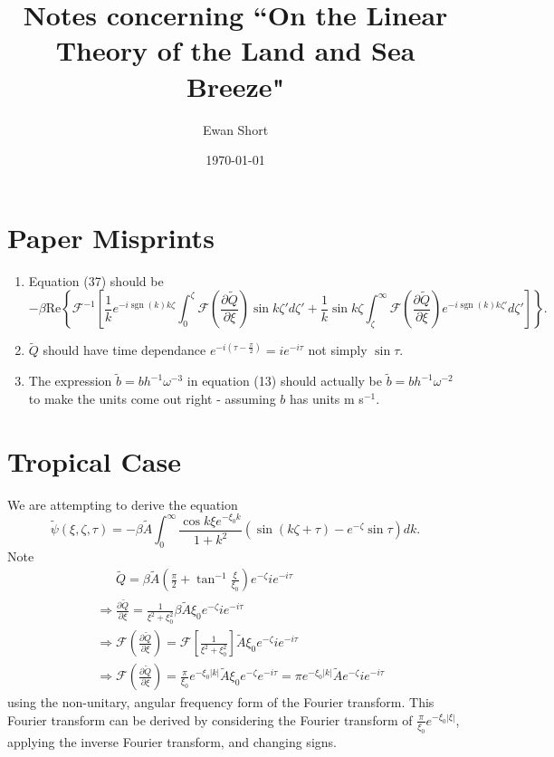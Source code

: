 \documentclass[12pt]{article}
\title{Notes concerning ``On the Linear Theory of the Land and Sea Breeze"  \citep{rotunno83}}
\author{Ewan Short}
\date{\today}
\DeclareMathOperator{\sgn}{sgn}
\begin{document}
\maketitle

\section{Paper Misprints}
\begin{enumerate}
\item
Equation (37) should be 
\begin{equation*}
 -\beta \textrm{Re}\left\{ \mathcal{F}^{-1}\left[ \frac{1}{k}e^{-i\sgn(k) k \zeta} \int_0^\zeta \mathcal{F}\left(\frac{\partial \tilde{Q}}{\partial \xi}\right) \sin k\zeta' d\zeta' + \frac{1}{k}\sin k \zeta \int_\zeta^\infty \mathcal{F}\left(\frac{\partial \tilde{Q}}{\partial \xi}\right) e^{-i\sgn(k)k\zeta'} d\zeta' \right] \right\}.
\end{equation*}
\item
$\tilde{Q}$ should have time dependance $e^{-i\left(\tau-\frac{\pi}{2}\right)}=ie^{-i\tau}$ not simply $\sin\tau$. 
\item
The expression $\tilde{b} = b h^{-1} \omega^{-3}$ in equation (13) should actually be $\tilde{b} = b h^{-1} \omega^{-2}$ to make the units come out right - assuming $b$ has units m s$^{-1}$. 
\end{enumerate}

\section{Tropical Case}
We are attempting to derive the equation
\begin{equation}
\tilde{\psi} (\xi,\zeta,\tau) = -\beta \tilde{A} \int_0^\infty \frac{\cos k\xi e^{-\xi_0 k }}{1+k^2} \left(\sin(k\zeta + \tau) - e^{-\zeta}\sin\tau \right) dk. \label{Eq:target}
\end{equation}
Note
\begin{align}
&\phantom{\Rightarrow} \tilde{Q} = \beta \tilde{A} \left(\frac{\pi}{2} +\tan^{-1} \frac{\xi}{\xi_0} \right)e^{-\zeta} i e^{-i\tau} \\
&\Rightarrow \frac{\partial \tilde{Q}}{\partial \xi} = \frac{1}{\xi^2 + \xi_0^2} \beta \tilde{A} \xi_0 e^{-\zeta} i e^{-i\tau} \\
&\Rightarrow \mathcal{F}\left(\frac{\partial \tilde{Q}}{\partial \xi}\right) = \mathcal{F}\left[ \frac{1}{\xi^2 + \xi_0^2} \right] \tilde{A} \xi_0 e^{-\zeta} i e^{-i\tau} \\
&\Rightarrow \mathcal{F}\left(\frac{\partial \tilde{Q}}{\partial \xi}\right) =  \frac{\pi}{\xi_0}e^{-\xi_0 |k|} \tilde{A} \xi_0 e^{-\zeta} e^{-i\tau} = \pi e^{-\xi_0 |k|} \tilde{A} e^{-\zeta} i e^{-i\tau}
\end{align}
using the non-unitary, angular frequency form of the Fourier transform. This Fourier transform can be derived by considering the Fourier transform of $\frac{\pi}{\xi_0}e^{-\xi_0|\xi|}$, applying the inverse Fourier transform, and changing signs.
\end{document}
